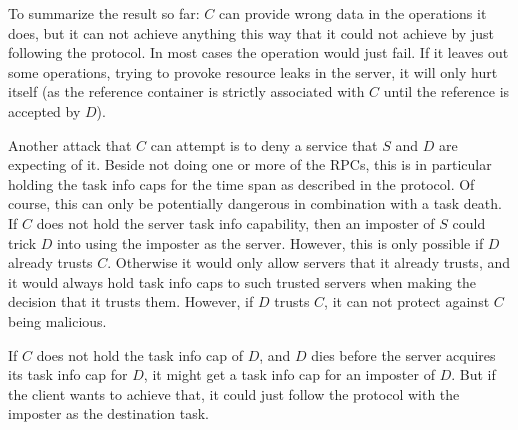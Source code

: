 To summarize the result so far: $C$ can provide wrong data in the
operations it does, but it can not achieve anything this way that it
could not achieve by just following the protocol.  In most cases the
operation would just fail.  If it leaves out some operations, trying
to provoke resource leaks in the server, it will only hurt itself (as
the reference container is strictly associated with $C$ until the
reference is accepted by $D$).

\begin{comment}
  For optimum performance, the server should be able to keep the
  information about the capabilities and reference containers a client
  holds on memory that is allocated on the clients behalf.
  
  It might also use some type of quota system.
\end{comment}

Another attack that $C$ can attempt is to deny a service that $S$ and
$D$ are expecting of it.  Beside not doing one or more of the RPCs,
this is in particular holding the task info caps for the time span as
described in the protocol.  Of course, this can only be potentially
dangerous in combination with a task death.  If $C$ does not hold the
server task info capability, then an imposter of $S$ could trick $D$
into using the imposter as the server.  However, this is only possible
if $D$ already trusts $C$.  Otherwise it would only allow servers that
it already trusts, and it would always hold task info caps to such
trusted servers when making the decision that it trusts them.
However, if $D$ trusts $C$, it can not protect against $C$ being
malicious.

\begin{comment}
  If $D$ does not trust $C$, it should only ever compare the task ID
  of the server thread against trusted servers it has a task info cap
  for.  It must not rely on $C$ doing that for $D$.
  
  However, if $D$ does trust $C$, it can rely on $C$ holding the
  server task info cap until it got its own.  Thus, the task ID of $C$
  can be used as the constraint when acquiring the task info cap in
  the protocol.
\end{comment}

If $C$ does not hold the task info cap of $D$, and $D$ dies before the
server acquires its task info cap for $D$, it might get a task info
cap for an imposter of $D$.  But if the client wants to achieve that,
it could just follow the protocol with the imposter as the destination
task.

